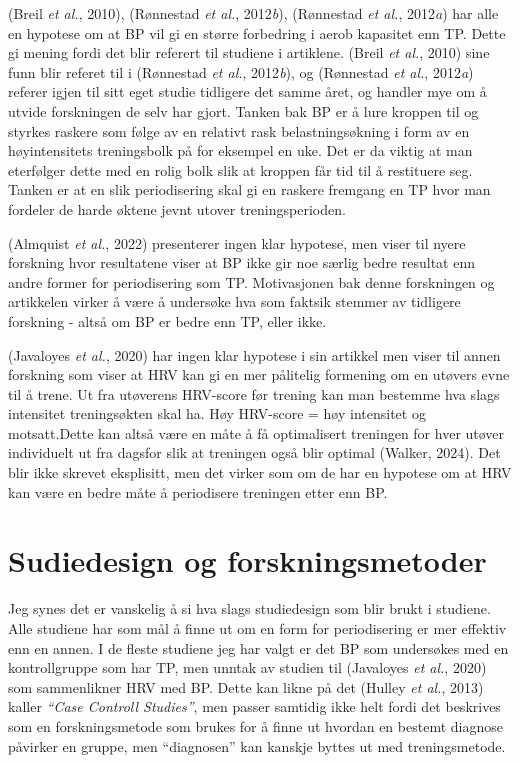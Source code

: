\documentclass[
  letterpaper,
  DIV=11,
  numbers=noendperiod]{scrreprt}
\begin{document}
(Breil \emph{et al.}, 2010), (Rønnestad \emph{et al.}, 2012\emph{b}),
(Rønnestad \emph{et al.}, 2012\emph{a}) har alle en hypotese om at BP
vil gi en større forbedring i aerob kapasitet enn TP. Dette gi mening
fordi det blir referert til studiene i artiklene. (Breil \emph{et al.},
2010) sine funn blir referet til i (Rønnestad \emph{et al.},
2012\emph{b}), og (Rønnestad \emph{et al.}, 2012\emph{a}) referer igjen
til sitt eget studie tidligere det samme året, og handler mye om å
utvide forskningen de selv har gjort. Tanken bak BP er å lure kroppen
til og styrkes raskere som følge av en relativt rask belastningsøkning i
form av en høyintensitets treningsbolk på for eksempel en uke. Det er da
viktig at man eterfølger dette med en rolig bolk slik at kroppen får tid
til å restituere seg. Tanken er at en slik periodisering skal gi en
raskere fremgang en TP hvor man fordeler de harde øktene jevnt utover
treningsperioden.

(Almquist \emph{et al.}, 2022) presenterer ingen klar hypotese, men
viser til nyere forskning hvor resultatene viser at BP ikke gir noe
særlig bedre resultat enn andre former for periodisering som TP.
Motivasjonen bak denne forskningen og artikkelen virker å være å
undersøke hva som faktsik stemmer av tidligere forskning - altså om BP
er bedre enn TP, eller ikke.

(Javaloyes \emph{et al.}, 2020) har ingen klar hypotese i sin artikkel
men viser til annen forskning som viser at HRV kan gi en mer pålitelig
formening om en utøvers evne til å trene. Ut fra utøverens HRV-score før
trening kan man bestemme hva slags intensitet treningsøkten skal ha. Høy
HRV-score = høy intensitet og motsatt.Dette kan altså være en måte å få
optimalisert treningen for hver utøver individuelt ut fra dagsfor slik
at treningen også blir optimal (Walker, 2024). Det blir ikke skrevet
eksplisitt, men det virker som om de har en hypotese om at HRV kan være
en bedre måte å periodisere treningen etter enn BP.

\section{Sudiedesign og
forskningsmetoder}\label{sudiedesign-og-forskningsmetoder}

Jeg synes det er vanskelig å si hva slags studiedesign som blir brukt i
studiene. Alle studiene har som mål å finne ut om en form for
periodisering er mer effektiv enn en annen. I de fleste studiene jeg har
valgt er det BP som undersøkes med en kontrollgruppe som har TP, men
unntak av studien til (Javaloyes \emph{et al.}, 2020) som sammenlikner
HRV med BP. Dette kan likne på det (Hulley \emph{et al.}, 2013) kaller
\emph{``Case Controll Studies''}, men passer samtidig ikke helt fordi
det beskrives som en forskningsmetode som brukes for å finne ut hvordan
en bestemt diagnose påvirker en gruppe, men ``diagnosen'' kan kanskje
byttes ut med treningsmetode.
\end{document}
